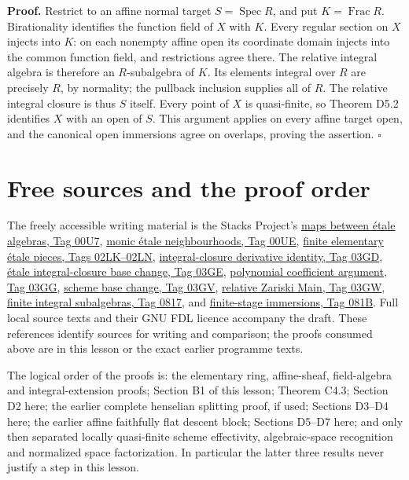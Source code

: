 \documentclass[11pt,a4paper,openany]{report}
\newcounter{none}
\begin{document}
\textbf{Proof.} Restrict to an affine normal target \(S=\operatorname{Spec}R\), and put \(K=\operatorname{Frac}R\). Birationality identifies the function field of \(X\) with \(K\). Every regular section on \(X\) injects into \(K\): on each nonempty affine open its coordinate domain injects into the common function field, and restrictions agree there. The relative integral algebra is therefore an \(R\)-subalgebra of \(K\). Its elements integral over \(R\) are precisely \(R\), by normality; the pullback inclusion supplies all of \(R\). The relative integral closure is thus \(S\) itself. Every point of \(X\) is quasi-finite, so Theorem D5.2 identifies \(X\) with an open of \(S\). This argument applies on every affine target open, and the canonical open immersions agree on overlaps, proving the assertion. \(\square\)

\section{Free sources and the proof order}\label{AG-RG-S04-free-sources-and-the-proof-order}

The freely accessible writing material is the Stacks Project's \href{https://stacks.math.columbia.edu/tag/00U7}{maps between étale algebras, Tag 00U7}, \href{https://stacks.math.columbia.edu/tag/00UE}{monic étale neighbourhoods, Tag 00UE}, \href{https://stacks.math.columbia.edu/tag/02LN}{finite elementary étale pieces, Tags 02LK--02LN}, \href{https://stacks.math.columbia.edu/tag/03GD}{integral-closure derivative identity, Tag 03GD}, \href{https://stacks.math.columbia.edu/tag/03GE}{étale integral-closure base change, Tag 03GE}, \href{https://stacks.math.columbia.edu/tag/03GG}{polynomial coefficient argument, Tag 03GG}, \href{https://stacks.math.columbia.edu/tag/03GV}{scheme base change, Tag 03GV}, \href{https://stacks.math.columbia.edu/tag/03GW}{relative Zariski Main, Tag 03GW}, \href{https://stacks.math.columbia.edu/tag/0817}{finite integral subalgebras, Tag 0817}, and \href{https://stacks.math.columbia.edu/tag/081B}{finite-stage immersions, Tag 081B}. Full local source texts and their GNU FDL licence accompany the draft. These references identify sources for writing and comparison; the proofs consumed above are in this lesson or the exact earlier programme texts.

The logical order of the proofs is: the elementary ring, affine-sheaf, field-algebra and integral-extension proofs; Section B1 of this lesson; Theorem C4.3; Section D2 here; the earlier complete henselian splitting proof, if used; Sections D3--D4 here; the earlier affine faithfully flat descent block; Sections D5--D7 here; and only then separated locally quasi-finite scheme effectivity, algebraic-space recognition and normalized space factorization. In particular the latter three results never justify a step in this lesson.
\end{document}
